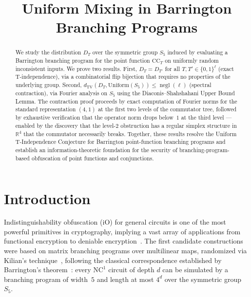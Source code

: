 \documentclass[version=submission]{iacrcc}
\title[running={Uniform Mixing in Barrington Programs}]{Uniform Mixing in Barrington Branching Programs}
\DeclareMathOperator{\negl}{negl}
\newcommand{\dtv}{d_{\mathrm{TV}}}
\newcommand{\CC}{\mathrm{CC}}
\begin{document}
\maketitle


\begin{abstract}
We study the distribution $D_T$ over the symmetric group $S_5$ induced by evaluating
a Barrington branching program for the point function $\CC_T$ on uniformly random
inconsistent inputs. We prove two results. First, $D_T = D_{T'}$ for all
$T, T' \in \{0,1\}^\ell$ (exact T-independence), via a combinatorial flip bijection
that requires no properties of the underlying group. Second,
$\dtv(D_T, \mathrm{Uniform}(S_5)) \leq \negl(\ell)$ (spectral contraction),
via Fourier analysis on $S_5$ using the Diaconis--Shahshahani Upper Bound Lemma.
The contraction proof proceeds by exact computation of Fourier norms for the standard
representation $(4,1)$ at the first two levels of the commutator tree, followed by
exhaustive verification that the operator norm drops below~$1$ at the third level
--- enabled by the discovery that the level-$2$ obstruction has a regular simplex
structure in $\mathbb{R}^4$ that the commutator necessarily breaks. Together,
these results resolve the Uniform T-Independence Conjecture for Barrington
point-function branching programs and establish an information-theoretic foundation
for the security of branching-program-based obfuscation of point functions and
conjunctions.
\end{abstract}


\section{Introduction}
\label{sec:intro}

Indistinguishability obfuscation (iO) for general circuits is one of the most
powerful primitives in cryptography, implying a vast array of applications from
functional encryption to deniable encryption~\cite{GGH+13,SW14}. The first
candidate constructions~\cite{GGH+13} were based on matrix branching programs
over multilinear maps, randomized via Kilian's
technique~\cite{Kil88}, following the classical correspondence established by
Barrington's theorem~\cite{Bar89}: every $\mathrm{NC}^1$ circuit of depth $d$
can be simulated by a branching program of width~$5$ and length at most $4^d$
over the symmetric group $S_5$.
\end{document}
